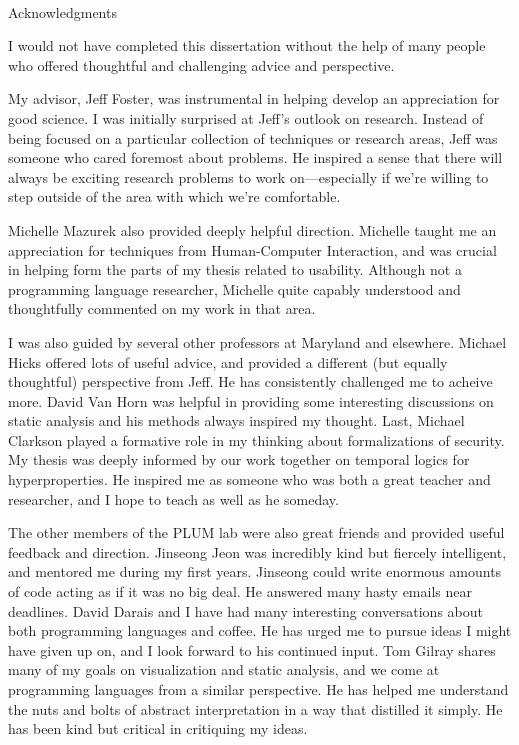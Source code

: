 
\renewcommand{\baselinestretch}{2}
\small\normalsize
\hbox{\ }
 
\vspace{-.65in}

\begin{center}
\large{Acknowledgments} 
\end{center} 

\vspace{1ex}

I would not have completed this dissertation without the help of many
people who offered thoughtful and challenging advice and perspective.

My advisor, Jeff Foster, was instrumental in helping develop an
appreciation for good science. I was initially surprised at Jeff's
outlook on research. Instead of being focused on a particular
collection of techniques or research areas, Jeff was someone who cared
foremost about problems.  He inspired a sense that there will always
be exciting research problems to work on---especially if we're willing
to step outside of the area with which we're comfortable.

Michelle Mazurek also provided deeply helpful direction. Michelle
taught me an appreciation for techniques from Human-Computer
Interaction, and was crucial in helping form the parts of my thesis
related to usability. Although not a programming language researcher,
Michelle quite capably understood and thoughtfully commented on my
work in that area.

I was also guided by several other professors at Maryland and
elsewhere. Michael Hicks offered lots of useful advice, and provided a
different (but equally thoughtful) perspective from Jeff. He has
consistently challenged me to acheive more. David Van Horn was helpful
in providing some interesting discussions on static analysis and his
methods always inspired my thought. Last, Michael Clarkson played a
formative role in my thinking about formalizations of security. My
thesis was deeply informed by our work together on temporal logics for
hyperproperties. He inspired me as someone who was both a great
teacher and researcher, and I hope to teach as well as he someday.

The other members of the PLUM lab were also great friends and provided
useful feedback and direction. Jinseong Jeon was incredibly kind but
fiercely intelligent, and mentored me during my first years. Jinseong
could write enormous amounts of code acting as if it was no big
deal. He answered many hasty emails near deadlines. David Darais and I
have had many interesting conversations about both programming
languages and coffee. He has urged me to pursue ideas I might have
given up on, and I look forward to his continued input. Tom Gilray
shares many of my goals on visualization and static analysis, and we
come at programming languages from a similar perspective. He has
helped me understand the nuts and bolts of abstract interpretation in
a way that distilled it simply. He has been kind but critical in
critiquing my ideas.


